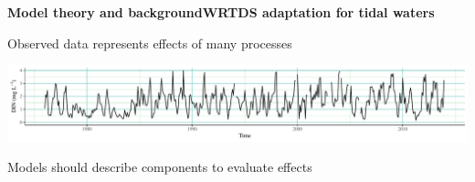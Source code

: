 \documentclass[serif]{beamer}\usepackage[]{graphicx}\usepackage[]{color}
\begin{document}
\begin{frame}[t]{\textbf{Model theory and background}}{\textbf{WRTDS adaptation for tidal waters}}
\onslide<+->
{\bf \centerline{Observed data represents effects of many processes}}
\vspace{0.15in}
\centerline{\includegraphics[width = \textwidth]{fig/ts_ex.pdf}}
\centerline{Models should describe components to evaluate effects}
\vspace{-0.1in}
\begin{columns}[t]
\begin{column}{0.5\textwidth}
\end{column}
\begin{column}{0.5\textwidth}
\end{column}
\end{columns}
\end{frame}
\end{document}
